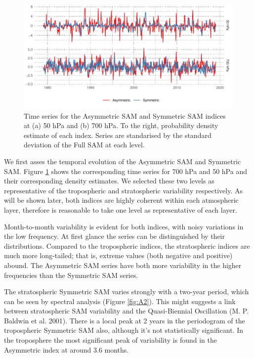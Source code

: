 \documentclass[smallextended]{svjour3}       %
\begin{document}
\begin{figure}
\includegraphics{figures/asymsam-timeseries-1} \caption{Time series for the Asymmetric SAM and Symmetric SAM indices at (a) 50 hPa and (b) 700 hPa. To the right, probability density estimate of each index. Series are standarised by the standard deviation of the Full SAM at each level.}\label{fig:asymsam-timeseries}
\end{figure}

We first asses the temporal evolution of the Asymmetric SAM and Symmetric SAM. Figure \ref{fig:asymsam-timeseries} shows the corresponding time series for 700 hPa and 50 hPa and their corresponding density estimates. We selected these two levels as representative of the tropospheric and stratospheric variability respectively. As will be shown later, both indices are highly coherent within each atmospheric layer, therefore is reasonable to take one level as representative of each layer.

Month-to-month variability is evident for both indices, with noisy variations in the low frequency. At first glance the series can be distinguished by their distributions. Compared to the tropospheric indices, the stratospheric indices are much more long-tailed; that is, extreme values (both negative and positive) abound. The Asymmetric SAM series have both more variability in the higher frequencies than the Symmetric SAM series.

The stratospheric Symmetric SAM varies strongly with a two-year period, which can be seen by spectral analysis (Figure \ref{fig:A2}). This might suggests a link between stratospheric SAM variability and the Quasi-Biennial Oscillation (M. P. Baldwin et al. 2001). There is a local peak at 2 years in the periodogram of the tropospheric Symmetric SAM also, although it's not statistically significant. In the troposphere the most significant peak of variability is found in the Asymmetric index at around 3.6 months.
\end{document}
